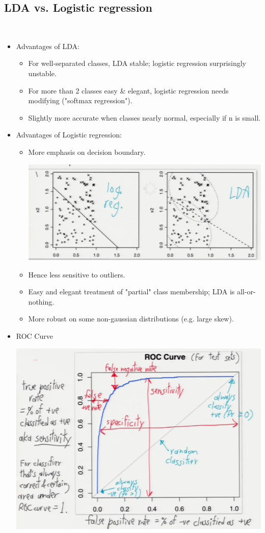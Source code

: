 \documentclass[10pt]{article}
\begin{document}
		\subsection*{LDA vs. Logistic regression}
		\
				\begin{itemize}
					\item Advantages of LDA:
						\begin{itemize}
							\item For well-separated classes, LDA stable; logistic regression surprisingly unstable.
							\item For more than 2 classes easy \& elegant, logistic regression needs modifying ("softmax regression").
							\item Slightly more accurate when classes nearly normal, especially if n is small.
						\end{itemize}
					\item Advantages of Logistic regression:
						\begin{itemize}
							\item More emphasis on decision boundary.
							\begin{center}
								\includegraphics[scale=0.5]{images/ldavsregression}
							\end{center}
							\item Hence less sensitive to outliers.
							\item Easy and elegant treatment of "partial" class membership; LDA is all-or-nothing.
							\item More robust on some non-gaussian distributions (e.g. large skew).
						\end{itemize}
					\item ROC Curve
						\begin{center}
							\includegraphics[scale=0.5]{images/ROCCurve}

\end{center}
\end{itemize}
\end{document}
